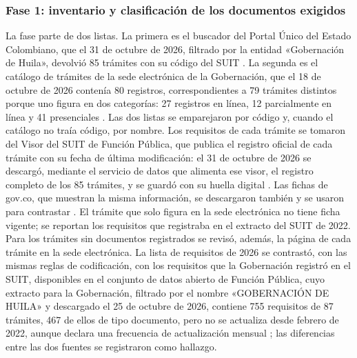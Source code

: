 \subsubsection{Fase 1: inventario y clasificación de los documentos exigidos}

La fase parte de dos listas. La primera es el buscador del Portal Único del Estado Colombiano, que el 31 de octubre de 2026, filtrado por la entidad «Gobernación de Huila», devolvió 85 trámites con su código del SUIT \parencite{govco2026fichas}. La segunda es el catálogo de trámites de la sede electrónica de la Gobernación, que el 18 de octubre de 2026 contenía 80 registros, correspondientes a 79 trámites distintos porque uno figura en dos categorías: 27 registros en línea, 12 parcialmente en línea y 41 presenciales \parencite{gobernaciondelhuila2026tramites}. Las dos listas se emparejaron por código y, cuando el catálogo no traía código, por nombre. Los requisitos de cada trámite se tomaron del Visor del SUIT de Función Pública, que publica el registro oficial de cada trámite con su fecha de última modificación: el 31 de octubre de 2026 se descargó, mediante el servicio de datos que alimenta ese visor, el registro completo de los 85 trámites, y se guardó con su huella digital \parencite{funcionpublica2026visorsuit}. Las fichas de gov.co, que muestran la misma información, se descargaron también y se usaron para contrastar \parencite{govco2026fichas}. El trámite que solo figura en la sede electrónica no tiene ficha vigente; se reportan los requisitos que registraba en el extracto del SUIT de 2022. Para los trámites sin documentos registrados se revisó, además, la página de cada trámite en la sede electrónica. La lista de requisitos de 2026 se contrastó, con las mismas reglas de codificación, con los requisitos que la Gobernación registró en el SUIT, disponibles en el conjunto de datos abierto de Función Pública, cuyo extracto para la Gobernación, filtrado por el nombre «GOBERNACIÓN DE HUILA» y descargado el 25 de octubre de 2026, contiene 755 requisitos de 87 trámites, 467 de ellos de tipo documento, pero no se actualiza desde febrero de 2022, aunque declara una frecuencia de actualización mensual \parencite{funcionpublica2022suit}; las diferencias entre las dos fuentes se registraron como hallazgo.

